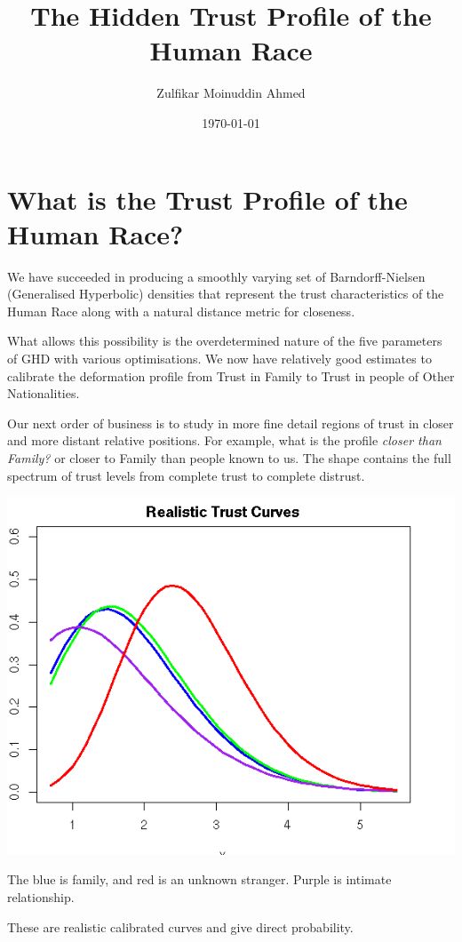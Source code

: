 \documentclass{amsart}
\title{The Hidden Trust Profile of the Human Race}
\author{Zulfikar Moinuddin Ahmed}
\date{\today}
\begin{document}
\maketitle

\section{What is the Trust Profile of the Human Race?}

We have succeeded in producing a smoothly varying set of Barndorff-Nielsen (Generalised Hyperbolic) densities that represent the trust characteristics of the Human Race along with a natural distance metric for closeness.

What allows this possibility is the overdetermined nature of the five parameters of GHD with various optimisations.  We now have relatively good estimates to calibrate the deformation profile from Trust in Family to Trust in people of Other Nationalities.

Our next order of business is to study in more fine detail regions of trust in closer and more distant relative positions.  For example, what is the profile {\em closer than Family?} or closer to Family than people known to us.  The shape contains the full spectrum of trust levels from complete trust to complete distrust.

\includegraphics[scale=0.8]{trust_curves.png}

The blue is family, and red is an unknown stranger.  Purple is intimate relationship.

These are realistic calibrated curves and give direct probability.
\end{document}
